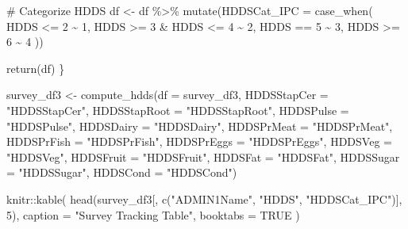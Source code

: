 \documentclass[
  letterpaper,
  DIV=11,
  numbers=noendperiod]{scrreprt}
\newenvironment{Shaded}{\begin{snugshade}}{\end{snugshade}}
\newcommand{\AttributeTok}[1]{\textcolor[rgb]{0.40,0.45,0.13}{#1}}
\newcommand{\CommentTok}[1]{\textcolor[rgb]{0.37,0.37,0.37}{#1}}
\newcommand{\ConstantTok}[1]{\textcolor[rgb]{0.56,0.35,0.01}{#1}}
\newcommand{\DecValTok}[1]{\textcolor[rgb]{0.68,0.00,0.00}{#1}}
\newcommand{\FunctionTok}[1]{\textcolor[rgb]{0.28,0.35,0.67}{#1}}
\newcommand{\NormalTok}[1]{\textcolor[rgb]{0.00,0.23,0.31}{#1}}
\newcommand{\OtherTok}[1]{\textcolor[rgb]{0.00,0.23,0.31}{#1}}
\newcommand{\SpecialCharTok}[1]{\textcolor[rgb]{0.37,0.37,0.37}{#1}}
\newcommand{\StringTok}[1]{\textcolor[rgb]{0.13,0.47,0.30}{#1}}
\begin{document}
\begin{Shaded}
\begin{Highlighting}[]
  \CommentTok{\# Categorize HDDS}
\NormalTok{  df }\OtherTok{\textless{}{-}}\NormalTok{ df }\SpecialCharTok{\%\textgreater{}\%}
    \FunctionTok{mutate}\NormalTok{(}\AttributeTok{HDDSCat\_IPC =} \FunctionTok{case\_when}\NormalTok{(}
\NormalTok{      HDDS }\SpecialCharTok{\textless{}=} \DecValTok{2} \SpecialCharTok{\textasciitilde{}} \DecValTok{1}\NormalTok{,}
\NormalTok{      HDDS }\SpecialCharTok{\textgreater{}=} \DecValTok{3} \SpecialCharTok{\&}\NormalTok{ HDDS }\SpecialCharTok{\textless{}=} \DecValTok{4} \SpecialCharTok{\textasciitilde{}} \DecValTok{2}\NormalTok{,}
\NormalTok{      HDDS }\SpecialCharTok{==} \DecValTok{5} \SpecialCharTok{\textasciitilde{}} \DecValTok{3}\NormalTok{,}
\NormalTok{      HDDS }\SpecialCharTok{\textgreater{}=} \DecValTok{6} \SpecialCharTok{\textasciitilde{}} \DecValTok{4}
\NormalTok{    ))}
  
  \FunctionTok{return}\NormalTok{(df)}
\NormalTok{\}}
\end{Highlighting}
\end{Shaded}

\begin{Shaded}
\begin{Highlighting}[]
\NormalTok{survey\_df3 }\OtherTok{\textless{}{-}} \FunctionTok{compute\_hdds}\NormalTok{(}\AttributeTok{df =}\NormalTok{ survey\_df3,}
                           \AttributeTok{HDDSStapCer =} \StringTok{"HDDSStapCer"}\NormalTok{,}
                           \AttributeTok{HDDSStapRoot =} \StringTok{"HDDSStapRoot"}\NormalTok{,}
                           \AttributeTok{HDDSPulse =} \StringTok{"HDDSPulse"}\NormalTok{,}
                           \AttributeTok{HDDSDairy =} \StringTok{"HDDSDairy"}\NormalTok{,}
                           \AttributeTok{HDDSPrMeat =} \StringTok{"HDDSPrMeat"}\NormalTok{,}
                           \AttributeTok{HDDSPrFish =} \StringTok{"HDDSPrFish"}\NormalTok{,}
                           \AttributeTok{HDDSPrEggs =} \StringTok{"HDDSPrEggs"}\NormalTok{,}
                           \AttributeTok{HDDSVeg =} \StringTok{"HDDSVeg"}\NormalTok{,}
                           \AttributeTok{HDDSFruit =} \StringTok{"HDDSFruit"}\NormalTok{,}
                           \AttributeTok{HDDSFat =} \StringTok{"HDDSFat"}\NormalTok{,}
                           \AttributeTok{HDDSSugar =} \StringTok{"HDDSSugar"}\NormalTok{,}
                           \AttributeTok{HDDSCond =} \StringTok{"HDDSCond"}\NormalTok{)}
\end{Highlighting}
\end{Shaded}

\begin{Shaded}
\begin{Highlighting}[]
\NormalTok{knitr}\SpecialCharTok{::}\FunctionTok{kable}\NormalTok{(}
  \FunctionTok{head}\NormalTok{(survey\_df3[, }\FunctionTok{c}\NormalTok{(}\StringTok{"ADMIN1Name"}\NormalTok{, }\StringTok{"HDDS"}\NormalTok{, }\StringTok{"HDDSCat\_IPC"}\NormalTok{)], }\DecValTok{5}\NormalTok{),}
  \AttributeTok{caption =} \StringTok{"Survey Tracking Table"}\NormalTok{,}
  \AttributeTok{booktabs =} \ConstantTok{TRUE}
\NormalTok{)}
\end{Highlighting}
\end{Shaded}
\end{document}
